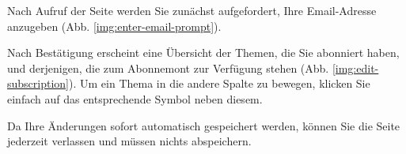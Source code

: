 Nach Aufruf der Seite werden Sie zunächst aufgefordert,
Ihre Email-Adresse anzugeben (Abb. \ref{img:enter-email-prompt}).


Nach Bestätigung erscheint eine Übersicht der Themen,
die Sie abonniert haben,
und derjenigen,
die zum Abonnemont zur Verfügung stehen
(Abb. \ref{img:edit-subscription}).
Um ein Thema in die andere Spalte zu bewegen,
klicken Sie einfach auf das entsprechende Symbol neben diesem.

Da Ihre Änderungen sofort automatisch gespeichert werden,
können Sie die Seite jederzeit verlassen
und müssen nichts abspeichern.

